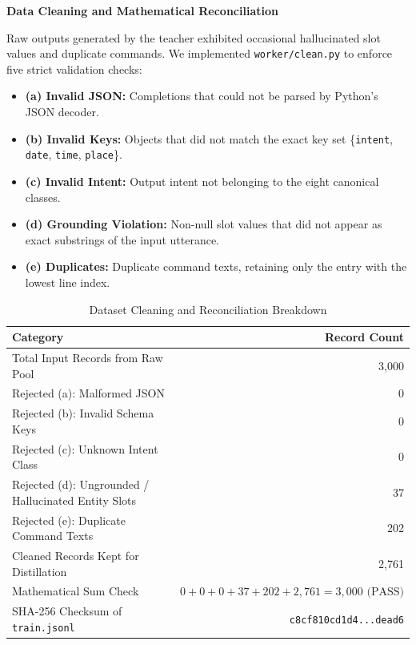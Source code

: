 \documentclass[10pt,a4paper]{article}
\begin{document}
\clearpage

\textbf{Data Cleaning and Mathematical Reconciliation}

Raw outputs generated by the teacher exhibited occasional hallucinated slot values and duplicate commands. We implemented \texttt{worker/clean.py} to enforce five strict validation checks:
\begin{itemize}
    \item \textbf{(a) Invalid JSON:} Completions that could not be parsed by Python's JSON decoder.
    \item \textbf{(b) Invalid Keys:} Objects that did not match the exact key set \{\texttt{intent}, \texttt{date}, \texttt{time}, \texttt{place}\}.
    \item \textbf{(c) Invalid Intent:} Output intent not belonging to the eight canonical classes.
    \item \textbf{(d) Grounding Violation:} Non-null slot values that did not appear as exact substrings of the input utterance.
    \item \textbf{(e) Duplicates:} Duplicate command texts, retaining only the entry with the lowest line index.
\end{itemize}

\begin{table}[h!]
\centering
\small
\begin{tabularx}{\textwidth}{Xr}
\toprule
\textbf{Category} & \textbf{Record Count} \\
\midrule
Total Input Records from Raw Pool & 3,000 \\
Rejected (a): Malformed JSON & 0 \\
Rejected (b): Invalid Schema Keys & 0 \\
Rejected (c): Unknown Intent Class & 0 \\
Rejected (d): Ungrounded / Hallucinated Entity Slots & 37 \\
Rejected (e): Duplicate Command Texts & 202 \\
Cleaned Records Kept for Distillation & 2,761 \\
\midrule
Mathematical Sum Check & $0 + 0 + 0 + 37 + 202 + 2,761 = 3,000\text{ (PASS)}$ \\
SHA-256 Checksum of \texttt{train.jsonl} & \texttt{c8cf810cd1d4...dead6} \\
\bottomrule
\end{tabularx}
\caption{Dataset Cleaning and Reconciliation Breakdown}
\label{tab:task1_cleaning}
\end{table}
\end{document}
